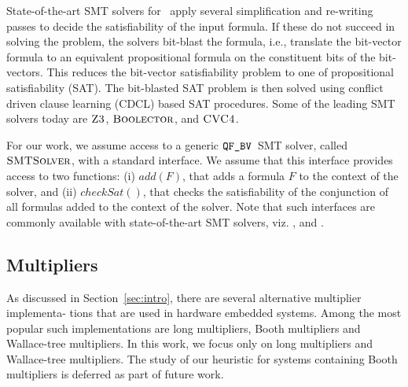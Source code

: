 
%
State-of-the-art SMT solvers for \qfbv~apply several simplification and
re-writing passes to decide the satisfiability of the input formula.
If these do not succeed in solving the problem, the solvers bit-blast
the formula, i.e., translate the bit-vector formula to an
equivalent propositional formula on the constituent bits of the
bit-vectors.  This reduces the bit-vector satisfiability problem to
one of propositional satisfiability (SAT).
%
The bit-blasted SAT problem is then solved using conflict driven clause
learning (CDCL)\cite{cdcl1,cdcl2} based SAT procedures.
%
Some of the leading SMT solvers today are $\textsc{Z3}$\cite{zthree},
$\textsc{Boolector}$\cite{boolector}, and $\textsc{CVC4}$\cite{cvcfour}.

For our work, we assume access to a generic $\texttt{QF\_BV}$~SMT solver, called
$\textsc{SMTSolver}$, with a standard interface.
%
We assume that this interface provides access to two functions: (i) $add(F)$, that adds a
formula $F$ to the context of the solver, and (ii) $checkSat()$,
that checks the satisfiability of the conjunction of all formulas
added to the context of the solver.  Note that such interfaces are commonly
available with state-of-the-art SMT solvers, viz. {\boolector},
{\cvcfour} and {\zthree}.

\subsection{Multipliers}

As discussed in Section~\ref{sec:intro}, there are several alternative multiplier implementa-
tions that are used in hardware embedded systems. Among the most popular such implementations are long multipliers, Booth multipliers and Wallace-tree
multipliers. In this work, we focus only on long multipliers and Wallace-tree
multipliers. The study of our heuristic for systems containing Booth multipliers
is deferred as part of future work. %
%
%
%
%
%


